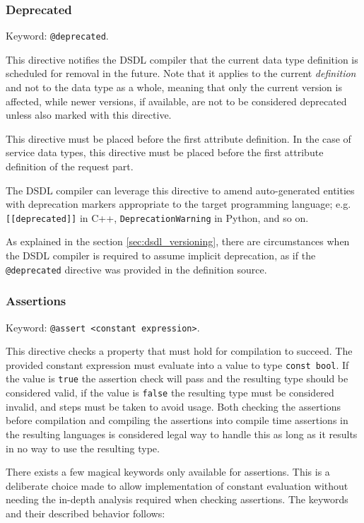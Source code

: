 \subsubsection{Deprecated}

Keyword: \verb|@deprecated|.

This directive notifies the DSDL compiler that the current data type definition
is scheduled for removal in the future.
Note that it applies to the current \emph{definition} and not to the data type as a whole,
meaning that only the current version is affected, while newer versions,
if available, are not to be considered deprecated unless also marked with this directive.

This directive must be placed before the first attribute definition.
In the case of service data types, this directive must be placed before the first
attribute definition of the request part.

The DSDL compiler can leverage this directive to amend auto-generated entities with
deprecation markers appropriate to the target programming language;
e.g. \verb|[[deprecated]]| in C++, \verb|DeprecationWarning| in Python, and so on.

As explained in the section \ref{sec:dsdl_versioning},
there are circumstances when the DSDL compiler is required to assume implicit deprecation,
as if the \verb|@deprecated| directive was provided in the definition source.

\subsubsection{Assertions}

Keyword: \verb|@assert <constant expression>|.

This directive checks a property that must hold for compilation to succeed.
The provided constant expression must evaluate into a value to type \verb|const bool|.
If the value is \verb|true| the assertion check will pass and the resulting type should be considered valid,
if the value is \verb|false| the resulting type must be considered invalid, and steps must be taken to avoid usage.
Both checking the assertions before compilation and compiling the assertions into compile time assertions in the
resulting languages is considered legal way to handle this as long as it results in no way to use the resulting type.

There exists a few magical keywords only available for assertions.
This is a deliberate choice made to allow implementation of constant evaluation
without needing the in-depth analysis required when checking assertions.
The keywords and their described behavior follows: 

